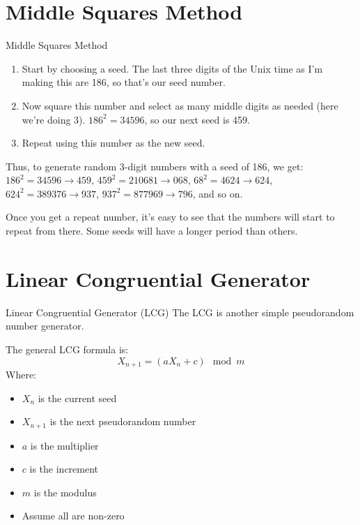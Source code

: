 \documentclass[aspectratio=169]{beamer}
\begin{document}
\section{Middle Squares Method}
\begin{frame}{Middle Squares Method}
\begin{enumerate}
    \item Start by choosing a seed. The last three digits of the Unix time as I'm making this are 186, so that's our seed number.
    \item Now square this number and select as many middle digits as needed (here we're doing 3). $186^2 = 34596$, so our next seed is 459. 
    \item Repeat using this number as the new seed.
\end{enumerate}
Thus, to generate random 3-digit numbers with a seed of 186, we get:
$186^2 = 34596 \rightarrow 459$, $459^2 = 210681 \rightarrow 068$, $68^2 = 4624 \rightarrow 624$, $624^2 = 389376 \rightarrow 937$, $937^2 = 877969 \rightarrow 796$, and so on. \pause

Once you get a repeat number, it's easy to see that the numbers will start to repeat from there. Some seeds will have a longer period than others.


\end{frame}
\section{Linear Congruential Generator}
\begin{frame}{Linear Congruential Generator (LCG)}
The LCG is another simple pseudorandom number generator.

The general LCG formula is:
\[X_{n+1} = (a X_n + c)\mod m\] \pause
Where:
\begin{itemize}
    \item \(X_n\) is the current seed
    \item \(X_{n+1}\) is the next pseudorandom number
    \item \(a\) is the multiplier
    \item \(c\) is the increment
    \item \(m\) is the modulus
    \item Assume all are non-zero
\end{itemize}
\end{frame}
\end{document}
